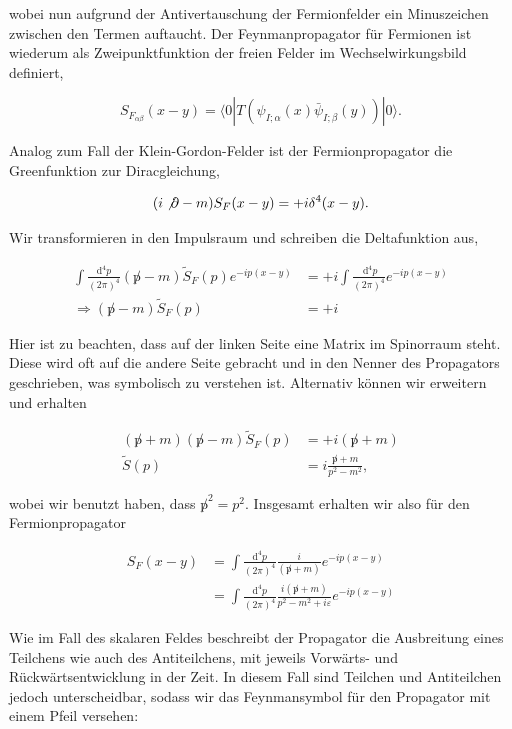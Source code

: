 \documentclass[10pt, letterpaper]{article}
\begin{document}
wobei nun aufgrund der Antivertauschung der Fermionfelder ein Minuszeichen zwischen den Termen auftaucht. Der Feynmanpropagator für Fermionen ist wiederum als Zweipunktfunktion der freien Felder im Wechselwirkungsbild definiert,

$$
S_{F_{\alpha \beta}}(x-y)=\langle 0| T\left(\psi_{I ; \alpha}(x) \bar{\psi}_{I ; \beta}(y)\right)|0\rangle .
$$

Analog zum Fall der Klein-Gordon-Felder ist der Fermionpropagator die Greenfunktion zur Diracgleichung,

$$
(i \not \partial-m) S_{F}(x-y)=+i \delta^{4}(x-y) .
$$

Wir transformieren in den Impulsraum und schreiben die Deltafunktion aus,

$$
\begin{aligned}
\int \frac{\mathrm{d}^{4} p}{(2 \pi)^{4}}(\not p-m) \tilde{S}_{F}(p) e^{-i p(x-y)} & =+i \int \frac{\mathrm{~d}^{4} p}{(2 \pi)^{4}} e^{-i p(x-y)} \\
\Rightarrow(\not p-m) \tilde{S}_{F}(p) & =+i
\end{aligned}
$$

Hier ist zu beachten, dass auf der linken Seite eine Matrix im Spinorraum steht. Diese wird oft auf die andere Seite gebracht und in den Nenner des Propagators geschrieben, was symbolisch zu verstehen ist. Alternativ können wir erweitern und erhalten

$$
\begin{aligned}
(\not p+m)(\not p-m) \tilde{S}_{F}(p) & =+i(\not p+m) \\
\tilde{S}(p) & =i \frac{\not p+m}{p^{2}-m^{2}},
\end{aligned}
$$

wobei wir benutzt haben, dass $\not p^{2}=p^{2}$. Insgesamt erhalten wir also für den Fermionpropagator

$$
\begin{aligned}
S_{F}(x-y) & =\int \frac{\mathrm{d}^{4} p}{(2 \pi)^{4}} \frac{i}{(\not p+m)} e^{-i p(x-y)} \\
& =\int \frac{\mathrm{d}^{4} p}{(2 \pi)^{4}} \frac{i(\not p+m)}{p^{2}-m^{2}+i \varepsilon} e^{-i p(x-y)}
\end{aligned}
$$

Wie im Fall des skalaren Feldes beschreibt der Propagator die Ausbreitung eines Teilchens wie auch des Antiteilchens, mit jeweils Vorwärts- und Rückwärtsentwicklung in der Zeit. In diesem Fall sind Teilchen und Antiteilchen jedoch unterscheidbar, sodass wir das Feynmansymbol für den Propagator mit einem Pfeil versehen:
\end{document}
